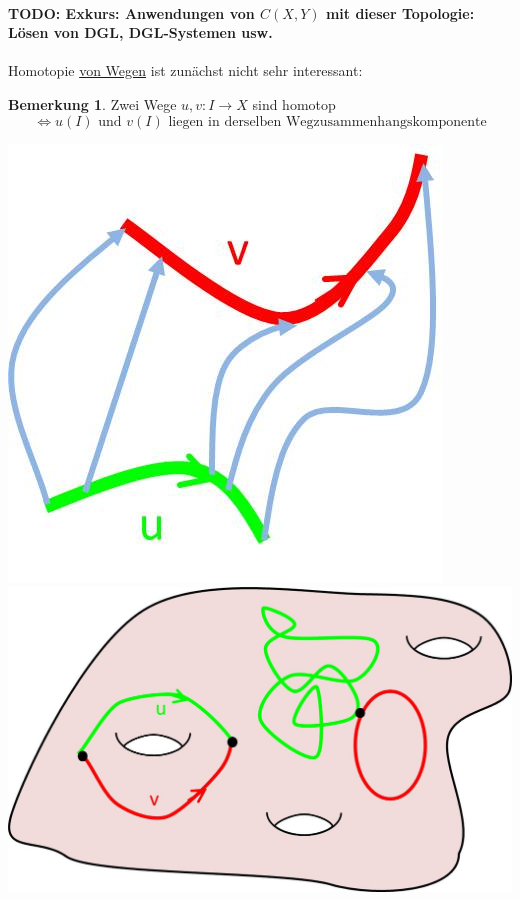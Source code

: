 \documentclass[a4paper,11pt,notitlepage]{report}
\theoremstyle{definition}
\newtheorem{remark}{Bemerkung}[chapter]
\begin{document}
\paragraph{TODO: Exkurs: Anwendungen von $C(X,Y)$ mit dieser Topologie: Lösen von DGL, DGL-Systemen usw.}

Homotopie \underline{von Wegen} ist zunächst nicht sehr interessant:

\begin{remark}{}
	Zwei Wege $u,v \colon I \rightarrow X$ sind homotop
	$$\Leftrightarrow u(I) \text{ und } v(I) \text{ liegen in derselben Wegzusammenhangskomponente}$$
	\begin{center}
		\includegraphics[scale=0.5]{images/Homotopie_zwischen_Wegen.jpg} 							\includegraphics[scale=0.35]{images/Homotopie_zwischen_Wegen2.jpg}
	\end{center}
\end{remark}
\end{document}
